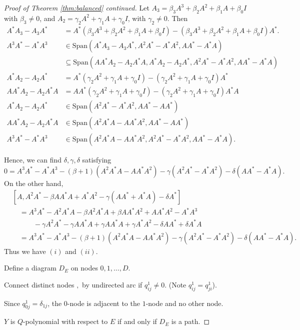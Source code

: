 \documentclass[
]{book}
\theoremstyle{definition}
\theoremstyle{definition}
\theoremstyle{definition}
\theoremstyle{definition}
\theoremstyle{remark}
\begin{document}
\begin{proof}[Proof of Theorem \ref{thm:balanced} continued]
Let \(A_3 = \beta_3A^3 + \beta_2 A^2 + \beta_1 A + \beta_0 I\) with \(\beta_3\neq 0\), and \(A_2 = \gamma_2 A^2 + \gamma_1 A + \gamma_0 I\), with \(\gamma_2\neq 0\). Then
\begin{align}
A^*A_3-A_3A^* & = A^*(\beta_3 A^3 + \beta_2 A^2 + \beta_1 A + \beta_0 I) - (\beta_3 A^3 + \beta_2 A^2 + \beta_1 A + \beta_0 I)A^*.\\
A^3A^*-A^*A^3 & \in \mathrm{Span}(A^*A_3 - A_3A^*, A^2A^* - A^*A^2, AA^*-A^*A)\\
& \subseteq \mathrm{Span}(AA^*A_2 - A_2A^*A, A^*A_2-A_2A^*, A^2A^*-A^*A^2, AA^*-A^*A)\\
A^*A_2 - A_2A^* & = A^*(\gamma_2 A^2 + \gamma_1 A + \gamma_0 I) - (\gamma_2 A^2 + \gamma_1 A + \gamma_0 I)A^*\\
AA^*A_2 - A_2A^*A & = AA^*(\gamma_2 A^2 + \gamma_1 A + \gamma_0 I) - (\gamma_2 A^2 + \gamma_1 A + \gamma_0 I)A^*A\\
A^*A_2 - A_2A^* & \in \mathrm{Span}(A^2A^*-A^*A^2, AA^*-AA^*)\\
AA^*A_2 - A_2A^*A & \in \mathrm{Span}(A^2A^*A-AA^*A^2, AA^*-AA^*)\\
A^3A^*-A^*A^3 & \in \mathrm{Span}(A^2A^*A-AA^*A^2, A^2A^*-A^*A^2, AA^*-A^*A).
\end{align}

Hence, we can find \(\delta, \gamma, \delta\) satisfying
\[0 = A^3A^*-A^*A^3 - (\beta+1)(A^2A^*A-AA^*A^2)-\gamma(A^2A^*-A^*A^2)-\delta(AA^*-A^*A).\]
On the other hand,
\begin{align}
& [A, A^2A^*-\beta AA^*A+A^*A^2-\gamma(AA^*+A^*A)-\delta A^*]\\
& \quad = A^3A^*-A^2A^*A-\beta A^2A^*A + \beta AA^*A^2 + AA^*A^2 - A^*A^3 \\
& \qquad\quad - \gamma A^2A^* - \gamma AA^*A + \gamma AA^*A + \gamma A^*A^2 - \delta AA^* + \delta A^*A\\
& \quad = A^3A^* - A^*A^3 - (\beta+1)(A^2A^*A-AA^*A^2)-\gamma(A^2A^*-A^*A^2)-\delta (AA^*-A^*A).
\end{align}
Thus we have \((i)\) and \((ii)\).

Define a diagram \(D_E\) on nodes \(0, 1, \ldots, D\).

Connect distinct nodes \(,\) by undirected arc if \(q^1_{ij}\neq 0\). (Note \(q^1_{ij} = q^1_{ji}\)).

Since \(q^1_{0j} = \delta_{1j}\), the \(0\)-node is adjacent to the \(1\)-node and no other node.

\(Y\) is \(Q\)-polynomial with respect to \(E\) if and only if \(D_E\) is a path.


\end{proof}
\end{document}
